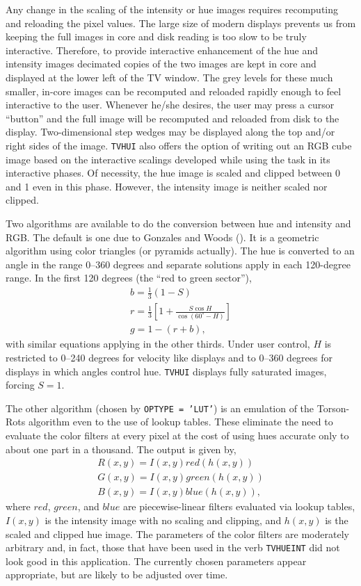      Any change in the scaling of the intensity or hue images requires
recomputing and reloading the pixel values.  The large size of modern
displays prevents us from keeping the full images in core and disk
reading is too slow to be truly interactive.  Therefore, to provide
interactive enhancement of the hue and intensity images decimated
copies of the two images are kept in core and displayed at the lower
left of the TV window.  The grey levels for these much smaller,
in-core images can be recomputed and reloaded rapidly enough to feel
interactive to the user.  Whenever he/she desires, the user may press
a cursor ``button'' and the full image will be recomputed and reloaded
from disk to the display.  Two-dimensional step wedges may be
displayed along the top and/or right sides of the image.  {\tt TVHUI}
also offers the option of writing out an RGB cube image based on the
interactive scalings developed while using the task in its interactive
phases.  Of necessity, the hue image is scaled and clipped between 0
and 1 even in this phase.  However, the intensity image is neither
scaled nor clipped.

     Two algorithms are available to do the conversion between hue and
intensity and \hbox{RGB}.  The default is one due to Gonzales and
Woods (\cite{kn:gonz}).  It is a geometric algorithm using color
triangles (or pyramids actually).  The hue is converted to an angle in
the range 0--360 degrees and separate solutions apply in each
120-degree range.  In the first 120 degrees (the ``red to green
sector''),\[ \begin{array}{c}
   b = \frac{1}{3} ( 1 - S ) \\
   r = \frac{1}{3} \left[ 1 + \frac{S \cos H}{\cos\left( 60^{\circ} -
        H \right)} \right] \\
   g = 1 - ( r + b ),
\end{array}\]
with similar equations applying in the other thirds.  Under user
control, $H$ is restricted to 0--240 degrees for velocity like
displays and to 0--360 degrees for displays in which angles control
hue.  {\tt TVHUI} displays fully saturated images, forcing $S = 1$.

     The other algorithm (chosen by {\tt OPTYPE = 'LUT'}) is an
emulation of the Torson-Rots algorithm even to the use of lookup
tables.  These eliminate the need to evaluate the color filters at
every pixel at the cost of using hues accurate only to about one part
in a thousand.  The output is given by,
\[ \begin{array}{c}
    R(x,y) = I(x,y)  red (h(x,y)) \\
    G(x,y) = I(x,y)  green (h(x,y)) \\
    B(x,y) = I(x,y)  blue (h(x,y)),
\end{array}\]
where $red$, $green$, and $blue$ are piecewise-linear filters
evaluated via lookup tables, $I(x,y)$ is the intensity image with no
scaling and clipping, and $h(x,y)$ is the scaled and clipped hue
image.  The parameters of the color filters are moderately arbitrary
and, in fact, those that have been used in the verb {\tt TVHUEINT} did
not look good in this application.  The currently chosen parameters
appear appropriate, but are likely to be adjusted over time.

